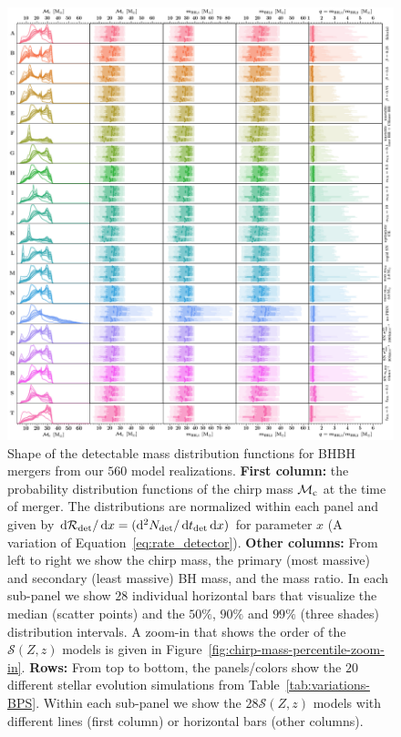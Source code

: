 \documentclass[fleqn,usenatbib]{mnras}
\newcommand\rate{\mathcal{R}}
\newcommand{\SFRD}{\ensuremath{\mathcal{S}(Z,z)}\xspace}
\newcommand{\tdet}{\ensuremath{{t}_{\rm{det}}}\xspace}
\newcommand{\Ndet}{\ensuremath{{N}_{\rm{det}}}\xspace}
\newcommand*\diff{\mathop{}\!\mathrm{d}}
\newcommand{\mchirpf}{\ensuremath{{\mathcal{M}}_{\rm{c}}}\xspace}
\newcommand{\Nmodels}{\ensuremath{560}\xspace}
\newcommand{\NmodelsBPS}{\ensuremath{20}\xspace}
\newcommand{\NmodelsMSSFR}{\ensuremath{28}\xspace}
\begin{document}
%
%
\begin{figure}
    \centering
\includegraphics[width=1\textwidth]{figures/KDEplot_massesdet_BBH.png} %
\caption{Shape of the detectable mass distribution functions for  BHBH mergers from our  \Nmodels model realizations. \textbf{First column:}  the probability distribution functions of the chirp mass  $\mchirpf$ at the time of merger. The distributions are normalized within each panel and given by $\diff \rate_{\rm{det}}/\diff x = (\diff^{2} \Ndet / \diff \tdet \diff x)$ for parameter $x$ (A variation of Equation~\ref{eq:rate_detector}). 
\textbf{Other columns:}  From left to right we show the chirp mass, the primary (most massive) and secondary (least massive) BH mass, and the mass ratio. In each sub-panel we show \NmodelsMSSFR  individual horizontal bars that visualize the median (scatter points) and the  $50\%$, $90\%$  and $99\%$  (three shades) distribution intervals.   A zoom-in that shows the order of the \SFRD models is given in Figure~\ref{fig:chirp-mass-percentile-zoom-in}. 
\textbf{Rows:} From top to bottom, the  panels/colors show the \NmodelsBPS different stellar evolution simulations from Table~\ref{tab:variations-BPS}.  Within each sub-panel we show the \NmodelsMSSFR \SFRD models with different lines (first column)  or horizontal bars (other columns).      \href{https://github.com/FloorBroekgaarden/Double-Compact-Object-Mergers/blob/main/plottingCode/Fig_4_and_Fig_5_and_Fig_6/KDEplot_massesdet_BBH.png}{\faFileImage} \href{https://github.com/FloorBroekgaarden/Double-Compact-Object-Mergers/blob/main/plottingCode/Fig_4_and_Fig_5_and_Fig_6/make_figure_4_5_and_6-Only_Masses.ipynb}{\faBook} }
    \label{fig:KDE-distributions-BHBH-masses}
\end{figure}
%
%
\end{document}
